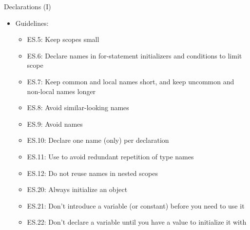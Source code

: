 \begin{frame}[t]{Declarations (I)}
\begin{itemize}
  \item Guidelines:
    \begin{itemize}
      \item ES.5: Keep scopes small
      \item ES.6: Declare names in for-statement initializers and 
            conditions to limit scope
      \item ES.7: Keep common and local names short, 
            and keep uncommon and non-local names longer
      \item ES.8: Avoid similar-looking names
      \item ES.9: Avoid  names
      \item ES.10: Declare one name (only) per declaration
      \item ES.11: Use  to avoid redundant repetition of type names
      \item ES.12: Do not reuse names in nested scopes
      \item ES.20: Always initialize an object
      \item ES.21: Don’t introduce a variable (or constant) before you need to use it
      \item ES.22: Don’t declare a variable until you have a value to initialize it with
    \end{itemize}
\end{itemize}
\end{frame}

